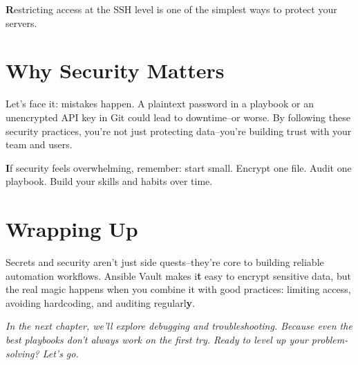 \textbf{R}estricting access at the SSH level is one of the simplest ways to protect your servers.


\section{Why Security Matters}

Let's face it: mistakes happen. A plaintext password in a playbook or an unencrypted API key in Git could lead to downtime--or worse. By following these security practices, you're not just protecting data--you're building trust with your team and users.

\textbf{I}f security feels overwhelming, remember: start small. Encrypt one file. Audit one playbook. Build your skills and habits over time.


\section{Wrapping Up}

Secrets and security aren't just side quests--they're core to building reliable automation workflows. Ansible Vault makes i\textbf{t} easy to encrypt sensitive data, but the real magic happens when you combine it with good practices: limiting access, avoiding hardcoding, and auditing regularl\textbf{y}.

\vspace{1em}

\textit{In the next chapter, we'll explore debugging and troubleshooting. Because even the best playbooks don't always work on the first try. Ready to level up your problem-solving? Let's go.}
